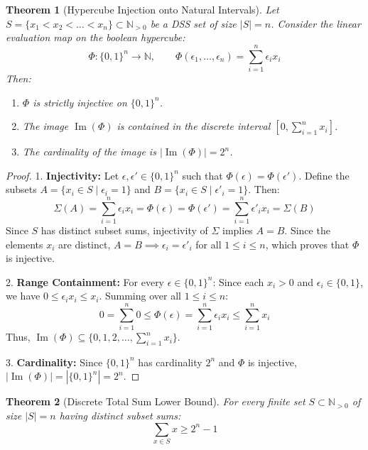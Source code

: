 \documentclass[11pt,a4paper]{article}
\newtheorem{theorem}{Theorem}[section]
\theoremstyle{definition}
\begin{document}
\begin{theorem}[Hypercube Injection onto Natural Intervals]\label{thm:hypercube_inj}
Let $S = \{x_1 < x_2 < \dots < x_n\} \subset \mathbb{N}_{>0}$ be a DSS set of size $|S| = n$.
Consider the linear evaluation map on the boolean hypercube:
\begin{equation}\label{eq:phi_map}
\Phi : \{0, 1\}^n \to \mathbb{N}, \qquad \Phi(\epsilon_1, \dots, \epsilon_n) = \sum_{i=1}^n \epsilon_i x_i
\end{equation}
Then:
\begin{enumerate}
    \item $\Phi$ is strictly injective on $\{0, 1\}^n$.
    \item The image $\operatorname{Im}(\Phi)$ is contained in the discrete interval $[0, \sum_{i=1}^n x_i]$.
    \item The cardinality of the image is $|\operatorname{Im}(\Phi)| = 2^n$.
\end{enumerate}
\end{theorem}

\begin{proof}
1. \textbf{Injectivity:} Let $\epsilon, \epsilon' \in \{0, 1\}^n$ such that $\Phi(\epsilon) = \Phi(\epsilon')$.
Define the subsets $A = \{x_i \in S \mid \epsilon_i = 1\}$ and $B = \{x_i \in S \mid \epsilon'_i = 1\}$.
Then:
\[ \Sigma(A) = \sum_{i=1}^n \epsilon_i x_i = \Phi(\epsilon) = \Phi(\epsilon') = \sum_{i=1}^n \epsilon'_i x_i = \Sigma(B) \]
Since $S$ has distinct subset sums, injectivity of $\Sigma$ implies $A = B$.
Since the elements $x_i$ are distinct, $A = B \implies \epsilon_i = \epsilon'_i$ for all $1 \le i \le n$, which proves that $\Phi$ is injective.

2. \textbf{Range Containment:} For every $\epsilon \in \{0, 1\}^n$:
Since each $x_i > 0$ and $\epsilon_i \in \{0, 1\}$, we have $0 \le \epsilon_i x_i \le x_i$.
Summing over all $1 \le i \le n$:
\[ 0 = \sum_{i=1}^n 0 \le \Phi(\epsilon) = \sum_{i=1}^n \epsilon_i x_i \le \sum_{i=1}^n x_i \]
Thus, $\operatorname{Im}(\Phi) \subseteq \{0, 1, 2, \dots, \sum_{i=1}^n x_i\}$.

3. \textbf{Cardinality:} Since $\{0, 1\}^n$ has cardinality $2^n$ and $\Phi$ is injective, $|\operatorname{Im}(\Phi)| = |\{0, 1\}^n| = 2^n$.
\end{proof}

\begin{theorem}[Discrete Total Sum Lower Bound]\label{thm:total_sum}
For every finite set $S \subset \mathbb{N}_{>0}$ of size $|S| = n$ having distinct subset sums:
\begin{equation}\label{eq:total_sum_bound}
\sum_{x \in S} x \ge 2^n - 1
\end{equation}
\end{theorem}
\end{document}
